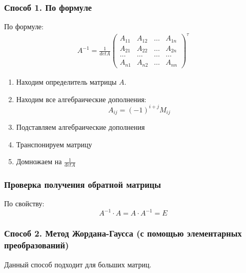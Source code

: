 \subsubsection*{Способ 1. По формуле}

По формуле:
\begin{gather*}
  A^{-1} = \frac{1}{det A}
  \begin{pmatrix}
    A_{11} & A_{12} & \ldots & A_{1n} \\
    A_{21} & A_{22} & \ldots & A_{2n} \\
    \ldots & \ldots & \ldots & \ldots \\
    A_{n1} & A_{n2} & \ldots & A_{nn}
  \end{pmatrix}^{\tau}
\end{gather*}

\begin{enumerate}
  \item Находим определитель матрицы $A$.
  \item Находим все алгебраические дополнения: \[
      A_{ij} = (-1)^{i + j} M_{ij}
  \] 
  \item Подставляем алгебраические дополнения
  \item Транспонируем матрицу
  \item Домножаем на $\frac{1}{det A}$
\end{enumerate}

\subsubsection*{Проверка получения обратной матрицы}

По свойству: \[
  A^{-1} \cdot A = A \cdot A^{-1} = E
\] 

\subsubsection*{Способ 2. Метод Жордана-Гаусса (с помощью элементарных преобразований)}

Данный способ подходит для больших матриц.

